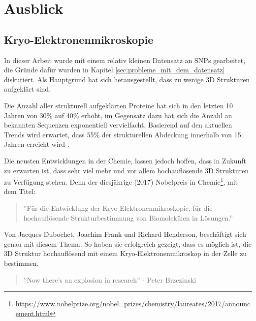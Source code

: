 \chapter{Ausblick}



\section{Kryo-Elektronenmikroskopie}

In dieser Arbeit wurde mit einem relativ kleinen Datensatz an \ac{SNP}s gearbeitet, die Gründe dafür wurden in Kapitel \ref{sec:probleme_mit_dem_datensatz} diskutiert. Als Hauptgrund hat sich herausgestellt, dass zu wenige 3D Strukturen aufgeklärt sind. 

Die Anzahl aller strukturell aufgeklärten Proteine hat sich in den letzten 10 Jahren von 30\% auf 40\% erhöht, im Gegensatz dazu hat sich die Anzahl an bekannten Sequenzen exponentiell vervielfacht. Basierend auf den aktuellen Trends wird erwartet, dass 55\% der strukturellen Abdeckung innerhalb von 15 Jahren erreicht wird \cite{Khafizov.2014}.

Die neusten Entwicklungen in der Chemie, lassen jedoch hoffen, dass in Zukunft zu erwarten ist, dass sehr viel mehr und vor allem hochauflösende 3D Strukturen zu Verfügung stehen. Denn der diesjährige (2017) Nobelpreis in Chemie\footnote{\url{https://www.nobelprize.org/nobel_prizes/chemistry/laureates/2017/announcement.html}
}, mit dem Titel:
\begin{quote}
    ''Für die Entwicklung der Kryo-Elektronenmikroskopie, für die hochauflösende Strukturbestimmung von Biomolekülen in Lösungen.''
\end{quote}
Von Jacques Dubochet, Joachim Frank und Richard Henderson, beschäftigt sich genau mit diesem Thema. So haben sie erfolgreich gezeigt, dass es möglich ist, die 3D Struktur hochauflösend mit einem Kryo-Elektronenmikroskop in der Zelle zu bestimmen.

\begin{quote}
    ''Now there's an explosion in research''
    - Peter Brzezinski
\end{quote}


